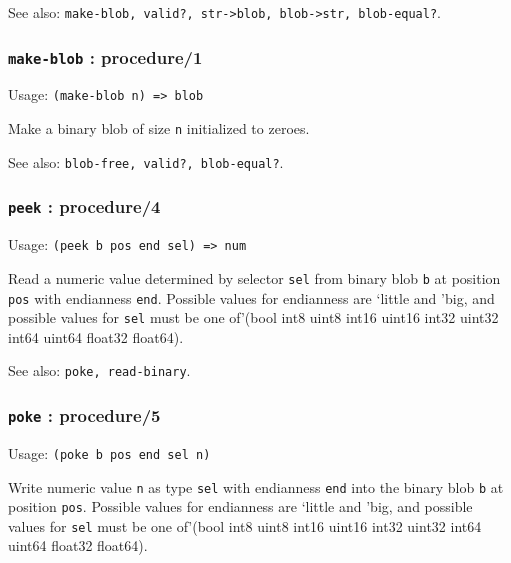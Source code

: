 \documentclass[
]{article}
\newcommand{\passthrough}[1]{#1}
\begin{document}
See also:
\passthrough{\lstinline!make-blob, valid?, str->blob, blob->str, blob-equal?!}.

\hypertarget{make-blob-procedure1}{%
\subsubsection{\texorpdfstring{\texttt{make-blob} :
procedure/1}{make-blob : procedure/1}}\label{make-blob-procedure1}}

Usage: \passthrough{\lstinline!(make-blob n) => blob!}

Make a binary blob of size \passthrough{\lstinline!n!} initialized to
zeroes.

See also: \passthrough{\lstinline!blob-free, valid?, blob-equal?!}.

\hypertarget{peek-procedure4}{%
\subsubsection{\texorpdfstring{\texttt{peek} :
procedure/4}{peek : procedure/4}}\label{peek-procedure4}}

Usage: \passthrough{\lstinline!(peek b pos end sel) => num!}

Read a numeric value determined by selector
\passthrough{\lstinline!sel!} from binary blob
\passthrough{\lstinline!b!} at position \passthrough{\lstinline!pos!}
with endianness \passthrough{\lstinline!end!}. Possible values for
endianness are `little and 'big, and possible values for
\passthrough{\lstinline!sel!} must be one of'(bool int8 uint8 int16
uint16 int32 uint32 int64 uint64 float32 float64).

See also: \passthrough{\lstinline!poke, read-binary!}.

\hypertarget{poke-procedure5}{%
\subsubsection{\texorpdfstring{\texttt{poke} :
procedure/5}{poke : procedure/5}}\label{poke-procedure5}}

Usage: \passthrough{\lstinline!(poke b pos end sel n)!}

Write numeric value \passthrough{\lstinline!n!} as type
\passthrough{\lstinline!sel!} with endianness
\passthrough{\lstinline!end!} into the binary blob
\passthrough{\lstinline!b!} at position \passthrough{\lstinline!pos!}.
Possible values for endianness are `little and 'big, and possible values
for \passthrough{\lstinline!sel!} must be one of'(bool int8 uint8 int16
uint16 int32 uint32 int64 uint64 float32 float64).
\end{document}
